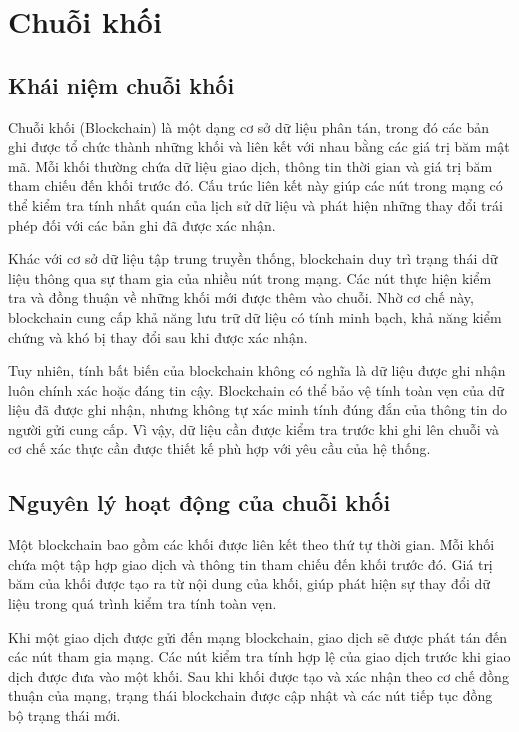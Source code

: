 \section{Chuỗi khối}

\subsection{Khái niệm chuỗi khối}

Chuỗi khối (Blockchain) là một dạng cơ sở dữ liệu phân tán, trong đó các bản ghi được tổ chức thành
những khối và liên kết với nhau bằng các giá trị băm mật mã. Mỗi khối thường chứa dữ liệu giao
dịch, thông tin thời gian và giá trị băm tham chiếu đến khối trước đó. Cấu trúc liên kết này giúp
các nút trong mạng có thể kiểm tra tính nhất quán của lịch sử dữ liệu và phát hiện những thay đổi
trái phép đối với các bản ghi đã được xác nhận.

Khác với cơ sở dữ liệu tập trung truyền thống, blockchain duy trì trạng thái dữ liệu thông qua sự
tham gia của nhiều nút trong mạng. Các nút thực hiện kiểm tra và đồng thuận về những khối mới được
thêm vào chuỗi. Nhờ cơ chế này, blockchain cung cấp khả năng lưu trữ dữ liệu có tính minh bạch, khả
năng kiểm chứng và khó bị thay đổi sau khi được xác nhận.

Tuy nhiên, tính bất biến của blockchain không có nghĩa là dữ liệu được ghi nhận luôn chính xác hoặc
đáng tin cậy. Blockchain có thể bảo vệ tính toàn vẹn của dữ liệu đã được ghi nhận, nhưng không tự
xác minh tính đúng đắn của thông tin do người gửi cung cấp. Vì vậy, dữ liệu cần được kiểm tra trước
khi ghi lên chuỗi và cơ chế xác thực cần được thiết kế phù hợp với yêu cầu của hệ thống.

\subsection{Nguyên lý hoạt động của chuỗi khối}

Một blockchain bao gồm các khối được liên kết theo thứ tự thời gian. Mỗi khối chứa một tập hợp giao
dịch và thông tin tham chiếu đến khối trước đó. Giá trị băm của khối được tạo ra từ nội dung của
khối, giúp phát hiện sự thay đổi dữ liệu trong quá trình kiểm tra tính toàn vẹn.

Khi một giao dịch được gửi đến mạng blockchain, giao dịch sẽ được phát tán đến các nút tham gia
mạng. Các nút kiểm tra tính hợp lệ của giao dịch trước khi giao dịch được đưa vào một khối. Sau khi
khối được tạo và xác nhận theo cơ chế đồng thuận của mạng, trạng thái blockchain được cập nhật và
các nút tiếp tục đồng bộ trạng thái mới.


